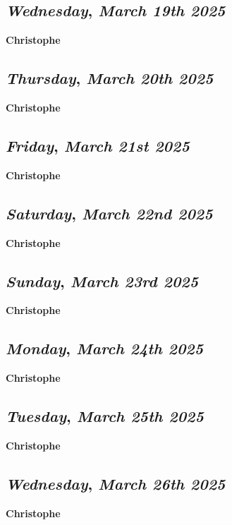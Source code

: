 \def\day{\textit{March 19th 2025}}
\def\weekday{\textit{Wednesday}}
\subsection*{\weekday, \day}
\textbf {Christophe}

\def\day{\textit{March 20th 2025}}
\def\weekday{\textit{Thursday}}
\subsection*{\weekday, \day}
\textbf {Christophe}

\def\day{\textit{March 21st 2025}}
\def\weekday{\textit{Friday}}
\subsection*{\weekday, \day}
\textbf {Christophe}

\def\day{\textit{March 22nd 2025}}
\def\weekday{\textit{Saturday}}
\subsection*{\weekday, \day}
\textbf {Christophe}

\def\day{\textit{March 23rd 2025}}
\def\weekday{\textit{Sunday}}
\subsection*{\weekday, \day}
\textbf {Christophe}

\def\day{\textit{March 24th 2025}}
\def\weekday{\textit{Monday}}
\subsection*{\weekday, \day}
\textbf {Christophe}

\def\day{\textit{March 25th 2025}}
\def\weekday{\textit{Tuesday}}
\subsection*{\weekday, \day}
\textbf {Christophe}

\def\day{\textit{March 26th 2025}}
\def\weekday{\textit{Wednesday}}
\subsection*{\weekday, \day}
\textbf {Christophe}

\def\day{\textit{March 27th 2025}}
\def\weekday{\textit{Thursday}}
